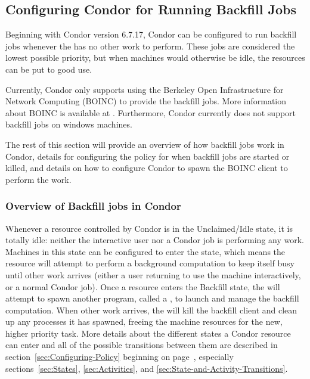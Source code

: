 \subsection{\label{sec:Backfill}Configuring Condor for Running Backfill Jobs} 


Beginning with Condor version 6.7.17, Condor can be configured to run
backfill jobs whenever the  has no other work to
perform.
These jobs are considered the lowest possible priority, but when
machines would otherwise be idle, the resources can be put to good 
use.

Currently, Condor only supports using the Berkeley Open Infrastructure
for Network Computing (BOINC) to provide the backfill jobs.
More information about BOINC is available at
.
Furthermore, Condor currently does not support backfill jobs on
windows machines.

The rest of this section will provide an overview of how backfill jobs
work in Condor, details for configuring the policy for when backfill
jobs are started or killed, and details on how to configure Condor to
spawn the BOINC client to perform the work.


\subsubsection{\label{sec:Backfill-Overview}Overview of Backfill jobs
in Condor}


Whenever a resource controlled by Condor is in the Unclaimed/Idle
state, it is totally idle: neither the interactive user nor a Condor
job is performing any work.
Machines in this state can be configured to enter the 
state, which means the resource will attempt to perform a background
computation to keep itself busy until other work arrives (either a 
user returning to use the machine interactively, or a normal Condor
job).
Once a resource enters the Backfill state, the  will
attempt to spawn another program, called a , to
launch and manage the backfill computation.
When other work arrives, the  will kill the backfill
client and clean up any processes it has spawned, freeing the machine
resources for the new, higher priority task.
More details about the different states a Condor resource can enter
and all of the possible transitions between them are described in
section~\ref{sec:Configuring-Policy} beginning on
page~\pageref{sec:Configuring-Policy}, especially
sections~\ref{sec:States}, \ref{sec:Activities}, and
\ref{sec:State-and-Activity-Transitions}.

